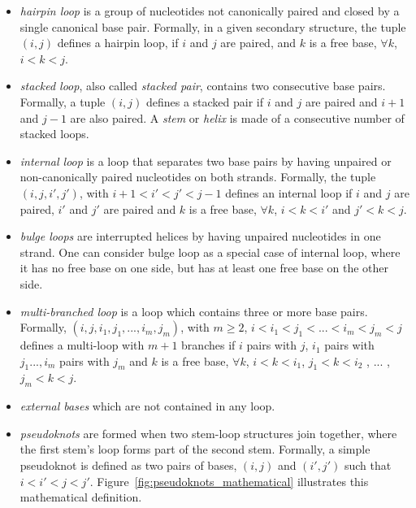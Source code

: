 \documentclass{doublecol-new}
\theoremstyle{TH}{
\newtheorem{lemma}{Lemma}
\newtheorem{theorem}[lemma]{Theorem}
\newtheorem{corrolary}[lemma]{Corrolary}
\newtheorem{conjecture}[lemma]{Conjecture}
\newtheorem{proposition}[lemma]{Proposition}
\newtheorem{claim}[lemma]{Claim}
\newtheorem{stheorem}[lemma]{Wrong Theorem}
\newtheorem{algorithm}{Algorithm}
}
\theoremstyle{THrm}{
\newtheorem{definition}{Definition}
\newtheorem{question}{Question}
\newtheorem{remark}{Remark}
\newtheorem{scheme}{Scheme}
}
\theoremstyle{THhit}{
\newtheorem{case}{Case}[section]
}
\begin{document}
\begin{itemize}
  \item {\em hairpin loop} is a group of nucleotides not canonically paired and closed by
    a single canonical base pair. Formally, in a given secondary structure, the tuple $(i,j)$
    defines a hairpin loop, if $i$ and $j$ are paired, and $k$ is a free base, $\forall k$,
    $i < k < j$.
\item {\em stacked loop}, also called {\em stacked pair},  contains two consecutive
    base pairs. Formally, a tuple $(i,j)$ defines a stacked pair if $i$ and $j$ are
    paired and $i+1$ and $j-1$ are also paired. A {\em stem} or {\em helix} is made of
    a consecutive number of stacked loops.
\item {\em internal loop} is a loop that separates two base pairs by having unpaired or non-canonically paired
    nucleotides on both strands. %
    Formally, the tuple $(i,j,i',j')$, with $i+1 < i' < j' < j-1$ defines an internal loop
    if $i$ and $j$ are paired, $i'$ and $j'$ are paired and $k$ is a free base,
    $\forall k$, $i < k < i'$ and $j' < k < j$.
\item {\em bulge loops} are interrupted helices by having unpaired nucleotides in one strand.
    One can consider bulge loop as a special case of internal loop, where it has no
    free base on one side, but has at least one free base on the other side.
\item {\em multi-branched loop} is a loop which contains three or more base pairs.
    Formally, $(i,j,i_1,j_1,...,i_m,j_m)$, with $m \ge 2$,
    $i < i_1 < j_1 < ... < i_m <  j_m < j$ defines a multi-loop with
    $m + 1$ branches if $i$ pairs with $j$, $i_1$ pairs with $j_1 ...,i_m$ pairs with $j_m$
    and $k$ is a free base, $\forall k$, $i < k < i_1$, $j_1 < k < i_2$ , ... , $j_m < k < j$.
\item {\em external bases} which are not contained in any loop.
\item {\em pseudoknots} are formed when two stem-loop  structures join together, where
    the first stem's loop forms part of the second stem.
    Formally, a simple pseudoknot is defined as two pairs of bases, $(i,j)$ and
    $(i',j')$ such that $i<i'<j<j'$.
    Figure~\ref{fig:pseudoknots_mathematical} illustrates this mathematical definition.
\end{itemize}
\end{document}
